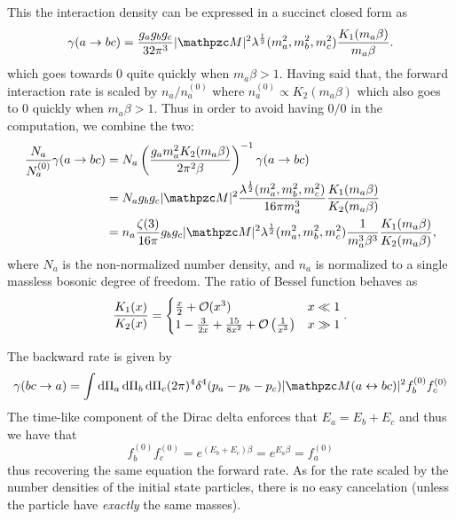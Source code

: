 \documentclass{scrartcl}
\begin{document}
This the interaction density can be expressed in a succinct closed form as
\begin{equation}
  \gamma(a \to bc) = \frac{g_a g_b g_c}{32 \pi^3} \abs{\pzcM}^2
  \lambda^{\frac{1}{2}}(m_a^2, m_b^2, m_c^2)
  \frac{K_1(m_a \beta)}{m_a \beta} .
\end{equation}
which goes towards 0 quite quickly when \(m_a \beta > 1\).  Having said that,
the forward interaction rate is scaled by \(n_a / n_a^{(0)}\) where \(n_a^{(0)}
\propto K_2(m_a \beta)\) which also goes to 0 quickly when \(m_a \beta > 1\).
Thus in order to avoid having \(0 / 0\) in the computation, we combine the two:
\begin{equation}
  \begin{aligned}
    \frac{N_a}{N_a^{(0)}} \gamma(a \to bc)
     & = N_a \left( \frac{g_a m_a^2 K_2(m_a \beta)}{2 \pi^2 \beta} \right)^{-1} \gamma(a \to bc) \\
     & = N_a g_b g_c \abs{\pzcM}^2
    \frac{\lambda^{\frac{1}{2}}(m_a^2, m_b^2, m_c^2)}{16 \pi m_a^3}
    \frac{K_1(m_a \beta)}{K_2(m_a \beta)}                                                        \\
     & = n_a \frac{\zeta(3)}{16 \pi} g_b g_c \abs{\pzcM}^2
    \lambda^{\frac{1}{2}}(m_a^2, m_b^2, m_c^2)
    \frac{1}{m_a^3 \beta^3}
    \frac{K_1(m_a \beta)}{K_2(m_a \beta)},
  \end{aligned}
\end{equation}
where \(N_a\) is the non-normalized number density, and \(n_a\) is normalized to
a single massless bosonic degree of freedom.  The ratio of Bessel function
behaves as
\begin{equation}
  \frac{K_1(x)}{K_2(x)} = \begin{cases}
    \frac{x}{2} + \mathcal{O}(x^3)                                              & x \ll 1 \\
    1 - \frac{3}{2x} + \frac{15}{8 x^2} + \mathcal{O}\left(\frac{1}{x^3}\right) & x \gg 1
  \end{cases}.
\end{equation}

The backward rate is given by
\begin{equation}
  \gamma(bc \to a) = \int \dd\Pi_a \dd\Pi_b \dd\Pi_c (2\pi)^4 \delta^4(p_a - p_b - p_c) \abs{\pzcM(a \leftrightarrow bc)}^2 f_b^{(0)} f_c^{(0)}
\end{equation}
The time-like component of the Dirac delta enforces that \(E_a = E_b + E_c\) and
thus we have that
\begin{equation}
  f_b^{(0)} f_c^{(0)} = e^{(E_b + E_c) \beta} = e^{E_a \beta} = f_a^{(0)}
\end{equation}
thus recovering the same equation the forward rate.  As for the rate scaled by
the number densities of the initial state particles, there is no easy
cancelation (unless the particle have \emph{exactly} the same masses).
\end{document}
